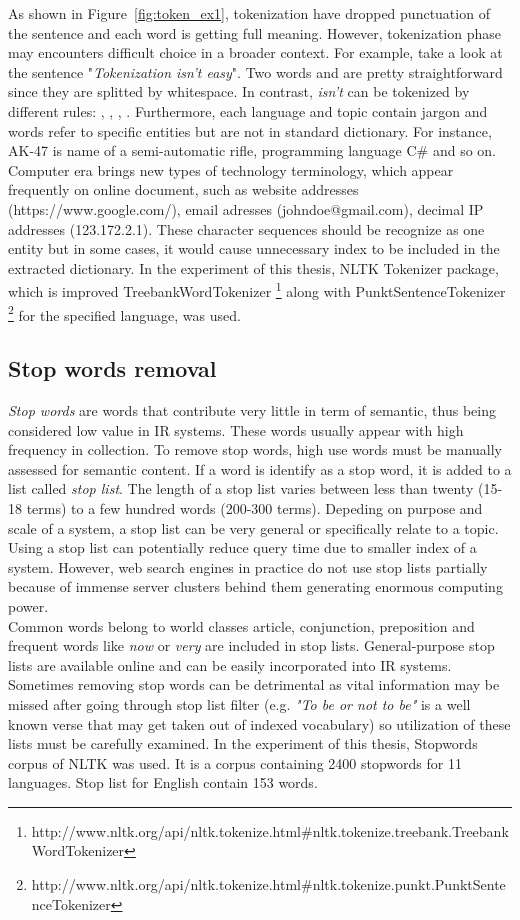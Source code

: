 As shown in Figure~\ref{fig:token_ex1}, tokenization have dropped punctuation of the sentence and each word is getting full meaning. However, tokenization phase may encounters difficult choice in a broader context. For example, take a look at the sentence "\textit{Tokenization isn't easy}". Two words  and  are pretty straightforward since they are splitted by whitespace. In contrast, \textit{isn't} can be tokenized by different rules: , ,  ,  . Furthermore, each language and topic contain jargon and words refer to specific entities but are not in standard dictionary. For instance, AK-47 is name of a semi-automatic rifle, programming language C\# and so on. Computer era brings new types of technology terminology, which appear frequently on online document, such as website addresses (https://www.google.com/), email adresses (johndoe@gmail.com), decimal IP addresses (123.172.2.1). These character sequences should be recognize as one entity but in some cases, it would cause unnecessary index to be included in the extracted dictionary. In the experiment of this thesis, NLTK Tokenizer package, which is improved TreebankWordTokenizer \footnote{http://www.nltk.org/api/nltk.tokenize.html\#nltk.tokenize.treebank.TreebankWordTokenizer} along with PunktSentenceTokenizer \footnote{http://www.nltk.org/api/nltk.tokenize.html\#nltk.tokenize.punkt.PunktSentenceTokenizer} for the specified language, was used.

\subsection*{Stop words removal}
\textit{Stop words} are words that contribute very little in term of semantic, thus being considered low value in IR systems. These words usually appear with high frequency in collection. To remove stop words, high use words must be manually assessed for semantic content. If a word is identify as a stop word, it is added to a list called \textit{stop list}. The length of a stop list varies between less than twenty (15-18 terms) to a few hundred words (200-300 terms). Depeding on purpose and scale of a system, a stop list can be very general or specifically relate to a topic.\\
Using a stop list can potentially reduce query time due to smaller index of a system. However, web search engines in practice do not use stop lists partially because of immense server clusters behind them generating enormous computing power. \\
Common words belong to world classes article, conjunction, preposition and frequent words like \textit{now} or \textit{very} are included in stop lists. General-purpose stop lists are available online and can be easily incorporated into IR systems. Sometimes removing stop words can be detrimental as vital information may be missed after going through stop list filter (e.g. \textit{"To be or not to be"} is a well known verse that may get taken out of indexed vocabulary) so utilization of these lists must be carefully examined. 
 In the experiment of this thesis, Stopwords corpus of NLTK was used. It is a corpus containing 2400 stopwords for 11 languages. Stop list for English contain 153 words.
